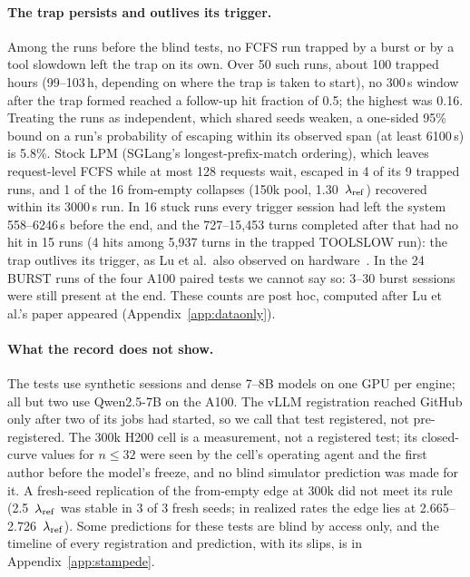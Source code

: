 \paragraph{The trap persists and outlives its trigger.} Among the runs before the blind tests, no FCFS run trapped by a burst or by a
tool slowdown left the trap on its own. Over 50 such runs, about 100 trapped hours (99--103\,h, depending on where the trap is taken
to start), no 300\,s window after the trap formed reached a follow-up hit fraction of 0.5; the highest was 0.16. Treating the runs as
independent, which shared seeds weaken, a one-sided 95\% bound on a run's probability of escaping within its observed span (at least
6100\,s) is 5.8\%. Stock LPM (SGLang's longest-prefix-match ordering), which leaves request-level FCFS while at most 128 requests wait, escaped in 4 of its 9 trapped runs, and 1 of
the 16 from-empty collapses (150k pool, 1.30~$\lambda_{\mathrm{ref}}$) recovered within its 3000\,s run. In 16 stuck runs every trigger session had
left the system 558--6246\,s before the end, and the 727--15{,}453 turns completed after that had no hit in 15 runs (4 hits among
5{,}937 turns in the trapped TOOLSLOW run): the trap outlives its trigger, as Lu et al.\ also observed on
hardware~\citep{lu2026cachetrap}. In the 24 BURST runs of the four A100 paired tests we cannot say so: 3--30 burst sessions were still
present at the end. These counts are post hoc, computed after Lu et al.'s paper appeared (Appendix~\ref{app:dataonly}).

\paragraph{What the record does not show.} The tests use synthetic sessions and dense 7--8B models on one GPU per engine; all but
two use Qwen2.5-7B on the A100. The vLLM registration reached GitHub only after two of its jobs had started, so we call that test
registered, not pre-registered. The 300k H200 cell is a measurement, not a registered test; its closed-curve values for $n\le32$ were
seen by the cell's operating agent and the first author before the model's freeze, and no blind simulator prediction was made for
it. A fresh-seed replication of the
from-empty edge at 300k did not meet its rule (2.5~$\lambda_{\mathrm{ref}}$ was stable in 3 of 3 fresh seeds; in realized rates the edge lies at
2.665--2.726~$\lambda_{\mathrm{ref}}$). Some predictions for these tests are blind by access only, and the timeline of every registration and
prediction, with its slips, is in Appendix~\ref{app:stampede}.
